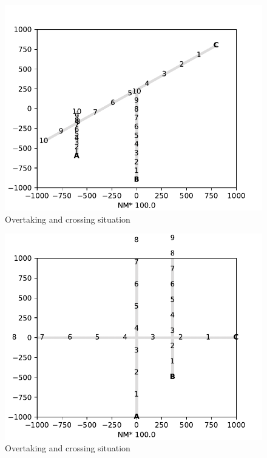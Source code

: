\begin{figure}[H]
    \centering
    \includegraphics[width=\textwidth,height=0.75\textheight,keepaspectratio]{Figures/Scenario/overtaking-and-crossing-3.pdf}
    \caption{Overtaking and crossing situation\cite{ecolreg_overtaking-and-crossing-3}}
    \label{fig:overtaking-and-crossing-3}
\end{figure}


\begin{figure}[H]
    \centering
    \includegraphics[width=\textwidth,height=0.75\textheight,keepaspectratio]{Figures/Scenario/overtaking-and-crossing-2.pdf}
    \caption{Overtaking and crossing situation\cite{ecolreg_overtaking-and-crossing-2}}
    \label{fig:overtaking-and-crossing-2}
\end{figure}
